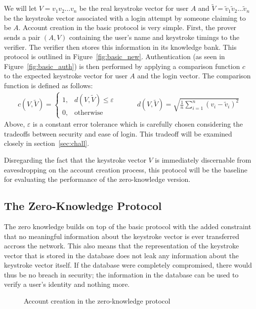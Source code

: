 \documentclass[11pt]{article}
\begin{document}
We will let $V=v_1v_2\ldots v_n$ be the real keystroke vector for user $A$ and $\tilde V = \tilde v_1\tilde v_2\ldots\tilde v_n$ be the keystroke vector associated with a login attempt by someone claiming to be $A$. Account creation in the basic protocol is very simple. First, the prover sends a pair $(A,V)$ containing the user's name and keystroke timings to the verifier. The verifier then stores this information in its knowledge bank. This protocol is outlined in Figure~\ref{fig:basic_new}. Authentication (as seen in Figure~\ref{fig:basic_auth}) is then performed by applying a comparison function $c$ to the expected keystroke vector for user $A$ and the login vector. The comparison function is defined as follows:
$$\begin{array}{ccc}
c(V,\tilde V) = \begin{cases}
  1, & d(V, \tilde V) \le \varepsilon \\
  0, & \text{otherwise}
\end{cases}
& \;\;\;\;\; &
d(V,\tilde V) = \sqrt{\frac1n\sum_{i=1}^n(v_i - \tilde v_i)^2}
\end{array}$$
Above, $\varepsilon$ is a constant error tolerance which is carefully chosen considering the tradeoffs between security and ease of login. This tradeoff will be examined closely in section~\ref{sec:chall}.

Disregarding the fact that the keystroke vector $V$ is immediately discernable from eavesdropping on the account creation process, this protocol will be the baseline for evaluating the performance of the zero-knowledge version.

\subsection{The Zero-Knowledge Protocol}
The zero knowledge builds on top of the basic protocol with the added constraint that no meaningful information about the keystroke vector is ever transferred accross the network. This also means that the representation of the keystroke vector that is stored in the database does not leak any information about the keystroke vector itself. If the database were completely compromised, there would thus be no breach in security; the information in the database can be used to verify a user's identity and nothing more.


\begin{figure}
\centering
{}
\caption{Account creation in the zero-knowledge protocol}
\label{fig:zk_new}
\end{figure}
\end{document}
